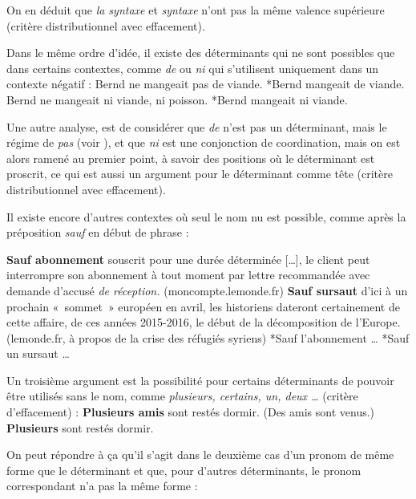 On en déduit que \textit{la syntaxe} et \textit{syntaxe} n’ont pas la même valence supérieure (critère distributionnel avec effacement).

Dans le même ordre d’idée, il existe des déterminants qui ne sont possibles que dans certains contextes, comme \textit{de} ou \textit{ni} qui s’utilisent uniquement dans un contexte négatif :
\ea
    {Bernd ne mangeait pas de viande.}
\z
\ea
    *{Bernd mangeait de viande.}
\z
\ea
    {Bernd ne mangeait ni viande, ni poisson}.
\z
\ea
    *{Bernd mangeait ni viande}.
\z

Une autre analyse, est de considérer que \textit{de} n’est pas un déterminant, mais le régime de \textit{pas} (voir ), et que \textit{ni} est une conjonction de coordination, mais on est alors ramené au premier point, à savoir des positions où le déterminant est proscrit, ce qui est aussi un argument pour le déterminant comme tête (critère distributionnel avec effacement).

Il existe encore d’autres contextes où seul le nom nu est possible, comme après la préposition \textit{sauf} en début de phrase :

\ea
\textbf{{Sauf abonnement}}  {souscrit pour une durée déterminée […],}  {le client peut interrompre son abonnement à tout moment par lettre recommandée avec demande d’accusé} \textit{de réception.} ({\textup{moncompte.lemonde.fr)}}
\z
\ea
\textbf{{Sauf sursaut}}  {d’ici à un prochain «~sommet~» européen en avril, les historiens dateront certainement de cette affaire, de ces années 2015-2016, le début de la décomposition de l’Europe.} (lemonde.fr, à propos de la crise des réfugiés syriens)
\z
\ea
*{Sauf l’abonnement …}
\z
\ea
*{Sauf un sursaut …}
\z

Un troisième argument est la possibilité pour certains déterminants de pouvoir être utilisés sans le nom, comme \textit{plusieurs, certains, un, deux …} (critère d’effacement) :
\ea
    \textbf{{Plusieurs amis}}  {sont restés dormir.}
\z
\ea
    ({Des amis sont venus.}) \textbf{{Plusieurs}}  {sont restés dormir.}
\z

On peut répondre à ça qu’il s’agit dans le deuxième cas d’un pronom de même forme que le déterminant et que, pour d’autres déterminants, le pronom correspondant n’a pas la même forme :


